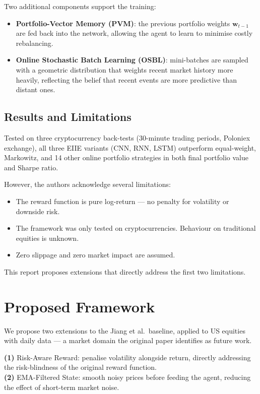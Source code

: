 \documentclass[12pt,a4paper]{article}
\begin{document}
Two additional components support the training:
\begin{itemize}[nosep]
  \item \textbf{Portfolio-Vector Memory (PVM)}: the previous portfolio
        weights $\mathbf{w}_{t-1}$ are fed back into the network,
        allowing the agent to learn to minimise costly rebalancing.
  \item \textbf{Online Stochastic Batch Learning (OSBL)}: mini-batches
        are sampled with a geometric distribution that weights recent
        market history more heavily, reflecting the belief that recent
        events are more predictive than distant ones.
\end{itemize}

\subsection{Results and Limitations}

Tested on three cryptocurrency back-tests (30-minute trading periods,
Poloniex exchange), all three EIIE variants (CNN, RNN, LSTM)
outperform equal-weight, Markowitz, and 14 other online portfolio
strategies in both final portfolio value and Sharpe ratio.

However, the authors acknowledge several limitations:
\begin{itemize}[nosep]
  \item The reward function is pure log-return --- no penalty for
        volatility or downside risk.
  \item The framework was only tested on cryptocurrencies. Behaviour
        on traditional equities is unknown.
  \item Zero slippage and zero market impact are assumed.
\end{itemize}
This report proposes extensions that directly address the first two
limitations.

\section{Proposed Framework}
\label{sec:proposed}

We propose two extensions to the Jiang et al.\ baseline, applied to
US equities with daily data --- a market domain the original paper
identifies as future work.

\begin{tcolorbox}[contribstyle]
\textbf{(1)} Risk-Aware Reward: penalise volatility alongside return,
directly addressing the risk-blindness of the original reward function.\\[4pt]
\textbf{(2)} EMA-Filtered State: smooth noisy prices before feeding
the agent, reducing the effect of short-term market noise.
\end{tcolorbox}
\end{document}
